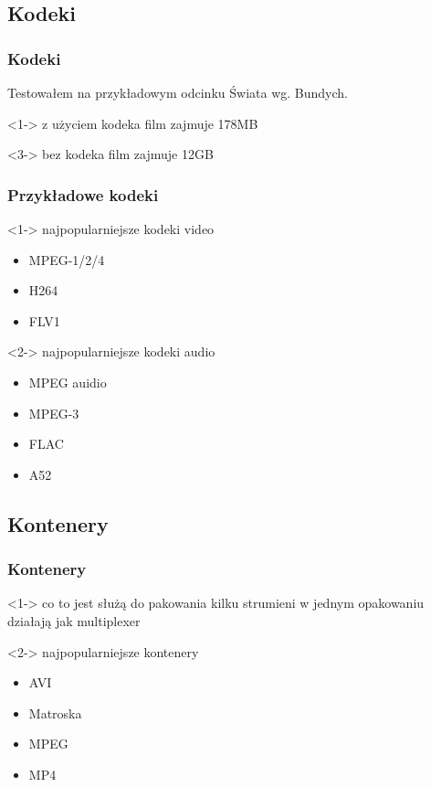 \documentclass[10pt]{beamer}
\begin{document}
\subsection{Kodeki}
\begin{frame}
	\frametitle{Kodeki}
	Testowałem na przykładowym odcinku Świata wg. Bundych.
	\begin{block}<1->
	{z użyciem kodeka}
	\uncover<2->
	{
		film zajmuje 178MB
	}
	\end{block}
	\begin{block}<3->
	{bez kodeka}
	\uncover<4->
	{
		film zajmuje 12GB
	}
	\end{block}
\end{frame}
\begin{frame}
	\frametitle{Przykładowe kodeki}
	\begin{block}<1->
	{najpopularniejsze kodeki video}
	\begin{itemize}
	\item MPEG-1/2/4
	\item H264
	\item FLV1
	\end{itemize}
	\end{block}
	\begin{block}<2->
	{najpopularniejsze kodeki audio}
	\begin{itemize}
	\item MPEG auidio
	\item MPEG-3
	\item FLAC
	\item A52
	\end{itemize}
	\end{block}
\end{frame}
\subsection{Kontenery}
\begin{frame}
	\frametitle{Kontenery}
	\begin{block}<1->
	{co to jest}
	służą do pakowania kilku strumieni w jednym opakowaniu\\
	działają jak multiplexer
	\end{block}
	\begin{block}<2->
	{najpopularniejsze kontenery}
	\begin{itemize}
	\item AVI
	\item Matroska
	\item MPEG
	\item MP4
	\end{itemize}
	\end{block}
\end{frame}
\end{document}
